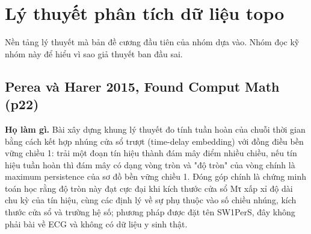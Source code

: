 \documentclass[12pt,a4paper]{article}
\begin{document}
\section{Lý thuyết phân tích dữ liệu topo}
Nền tảng lý thuyết mà bản đề cương đầu tiên của nhóm dựa vào. Nhóm đọc kỹ nhóm này để hiểu vì sao giả thuyết ban đầu sai.

\subsection{Perea và Harer 2015, Found Comput Math \normalfont\small (p22)}
\par\vspace{2pt}
\par\vspace{4pt}
\noindent \textbf{Họ làm gì.} Bài xây dựng khung lý thuyết đo tính tuần hoàn của chuỗi thời gian bằng cách kết hợp nhúng cửa sổ trượt (time-delay embedding) với đồng điều bền vững chiều 1: trải một đoạn tín hiệu thành đám mây điểm nhiều chiều, nếu tín hiệu tuần hoàn thì đám mây có dạng vòng tròn và "độ tròn" của vòng chính là maximum persistence của sơ đồ bền vững chiều 1. Đóng góp chính là chứng minh toán học rằng độ tròn này đạt cực đại khi kích thước cửa sổ Mτ xấp xỉ độ dài chu kỳ của tín hiệu, cùng các định lý về sự phụ thuộc vào số chiều nhúng, kích thước cửa sổ và trường hệ số; phương pháp được đặt tên SW1PerS, đây không phải bài về ECG và không có dữ liệu y sinh thật.\par\vspace{3pt}
\end{document}
